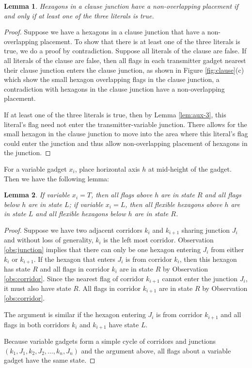 \documentclass[10pt]{CSUNthesis}
\theoremstyle{plain}%
\newtheorem{lem}{Lemma}
\theoremstyle{definition}
\theoremstyle{remark}
\newcommand{\lr}[1]{\left( #1 \right)}
\begin{document}
\begin{lem}\label{lem:aux-1}
Hexagons in a clause junction have a non-overlapping placement if and only if at least one of the three literals is true.
\end{lem}
\begin{proof}
Suppose we have a hexagons in a clause junction that have a non-overlapping placement.
To show that there is at least one of the three literals is true,  we do a proof by contradiction.
Suppose all literals of the clause are false.
If all literals of the clause are false, then all flags in each transmitter gadget nearest their clause junction enters the clause junction, as shown in Figure \ref{fig:clause}(c) which show the small hexagon overlapping flags in the clause junction, a contradiction with hexagons in the clause junction have a non-overlapping placement.

If at least one of the three literals is true, then by Lemma \ref{lem:aux-3}, this literal's flag need not enter the transmitter-variable junction.
There allows for the small hexagon in the clause junction to move into the area where this literal's flag could enter the junction and thus allow non-overlapping placement of hexagons in the junction.
\end{proof}

For a variable gadget $x_i$, place horizontal axis $h$ at mid-height of the gadget.
Then we have the following lemma:
\begin{lem}\label{lem:aux-2}
If variable $x_i = T$, then all flags above $h$ are in state $R$ and all flags below $h$ are in state $L$; if variable $x_i = L$, then all flexible hexagons above $h$ are in state $L$ and all flexible hexagons below $h$ are in state $R$.    
\end{lem}
\begin{proof}
Suppose we have two adjacent corridors $k_i$ and $k_{i+1}$ sharing junction $J_i$ and without loss of generality, $k_i$ is the left most corridor.
Observation \ref{obs:junction} implies that there can only be one hexagon entering $J_i$ from either $k_i$ or $k_{i+1}$. If the hexagon that enters $J_i$ is from corridor $k_i$, then this hexagon has state $R$ and all flags in corridor $k_i$ are in state $R$ by Observation \ref{obs:corridor}. 
Since the nearest flag of corridor $k_{i+1}$ cannot enter the junction $J_i$, it must also have state $R$.  
All flags in corridor $k_{i+1}$ are in state $R$ by Observation \ref{obs:corridor}. 

The argument is similar if the hexagon entering $J_i$ is from corridor $k_{i+1}$ and all flags in both corridors $k_i$ and $k_{i+1}$ have state $L$.

Because variable gadgets form a simple cycle of corridors and junctions $\lr{k_1, J_1, k_2, J_2, \dots, k_n, J_n}$ and the argument above, all flags about a variable gadget have the same state.
\end{proof}
\end{document}
